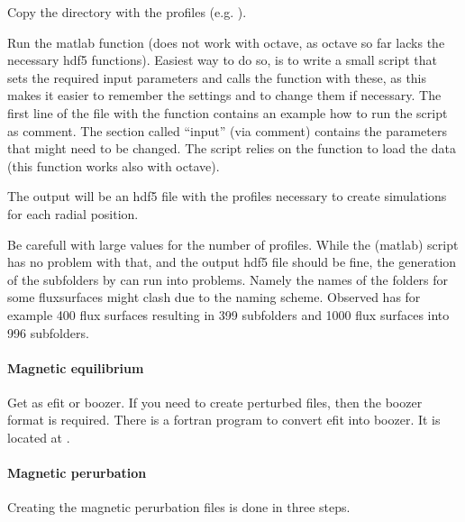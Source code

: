 Copy the directory with the profiles (e.g. ).

Run the matlab function  (does not
work with octave, as octave so far lacks the necessary hdf5 functions).
Easiest way to do so, is to write a small script that sets the required
input parameters and calls the function with these, as this makes it
easier to remember the settings and to change them if necessary.
The first line of the file with the function contains an example how to
run the script as comment.
The section called ``input'' (via comment) contains the parameters that
might need to be changed. The script relies on the function
 to load the data (this function works also with
octave).

The output will be an hdf5 file with the profiles necessary to create
simulations for each radial position.

Be carefull with large values for the number of profiles. While the
(matlab) script has no problem with that, and the output hdf5 file
should be fine, the generation of the subfolders by \neotwo can run into
problems. Namely the names of the folders for some fluxsurfaces might
clash due to the naming scheme.
Observed has for example 400 flux surfaces resulting in 399 subfolders
and 1000 flux surfaces into 996 subfolders.

\paragraph{Magnetic equilibrium}
Get as efit or boozer. If you need to create perturbed files, then the
boozer format is required.
There is a fortran program to convert efit into boozer. It is located at
.

\paragraph{Magnetic perurbation}
Creating the magnetic perurbation files is done in three steps.

